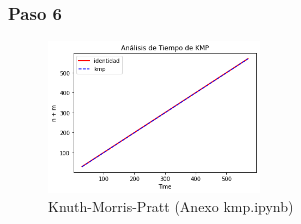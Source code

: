 \subsubsection*{Paso 6}

\begin{figure} [H]
    \includegraphics[width=0.5\textwidth]{../codigoPythonJupyter/kmp/Final.png}
    \caption{Knuth-Morris-Pratt (Anexo kmp.ipynb)}
    \label{fig:kmp}
\end{figure}



